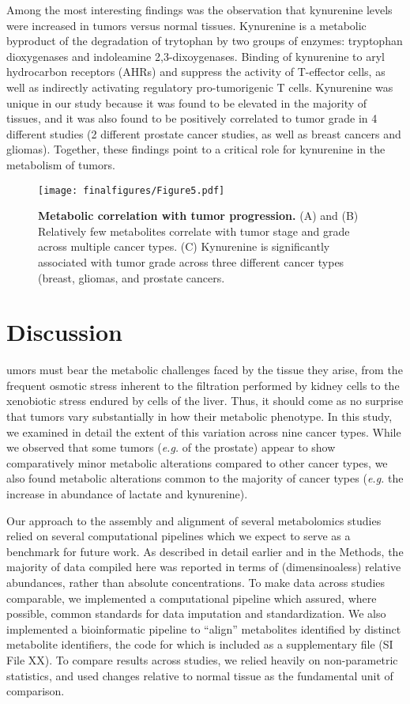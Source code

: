 \documentclass[10pt]{article}
\begin{document}
Among the most interesting findings was the observation that kynurenine levels were increased in tumors versus normal tissues. Kynurenine is a metabolic byproduct of the degradation of trytophan by two groups of enzymes: tryptophan dioxygenases and indoleamine 2,3-dixoygenases. Binding of kynurenine to aryl hydrocarbon receptors (AHRs) and suppress the activity of T-effector cells, as well as indirectly activating regulatory pro-tumorigenic T cells. Kynurenine was unique in our study because it was found to be elevated in the majority of tissues, and it was also found to be positively correlated to tumor grade in 4 different studies (2 different prostate cancer studies, as well as breast cancers and gliomas). Together, these findings point to a critical role for kynurenine in the metabolism of tumors.

\begin{figure}[ht!]
  \centering
     \texttt{[image: finalfigures/Figure5.pdf]}
  \caption{\textbf{Metabolic correlation with tumor progression.} (A) and (B) Relatively few metabolites correlate with tumor stage and grade across multiple cancer types. (C) Kynurenine is significantly associated with tumor grade across three different cancer types (breast, gliomas, and  prostate cancers.}
     \label{fig:Fig5}
\end{figure}


\section{Discussion}

umors must bear the metabolic challenges faced by the tissue they arise, from the frequent osmotic stress inherent to the filtration performed by kidney cells to the xenobiotic stress endured by cells of the liver. Thus, it should come as no surprise that tumors  vary substantially in how their metabolic phenotype. In this study, we examined in detail the extent of this variation across nine cancer types. While we observed that some tumors (\textit{e.g.} of the prostate) appear to show comparatively minor metabolic alterations compared to other cancer types, we also found metabolic alterations common to the majority of cancer types (\textit{e.g.} the increase in abundance of lactate and kynurenine). 

Our approach to the assembly and alignment of several metabolomics studies relied on several computational pipelines which we expect to serve as a benchmark for future work. As described in detail earlier and in the Methods, the majority of data compiled here was reported in terms of (dimensinoaless) relative abundances, rather than absolute concentrations. To make data across studies comparable, we implemented a computational pipeline which assured, where possible, common standards for data imputation and standardization. We also implemented a bioinformatic pipeline to ``align'' metabolites identified by distinct metabolite identifiers, the code for which is included as a supplementary file (SI File XX). To compare results across studies, we relied heavily on non-parametric statistics, and used changes relative to normal tissue as the fundamental unit of comparison. 
\end{document}
